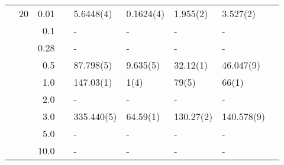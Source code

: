 \begin{table}[H]
\begin{tabularx}{\textwidth}{R{1cm}rrcR{2.3cm}R{2.3cm}R{2.3cm}R{2.3cm}R{1cm}}
		&20 & 0.01 && 5.6448(4) & 0.1624(4) & 1.955(2) & 3.527(2) \\
		&& 0.1 && - & - & - & - \\
		&& 0.28 && - & - & - & - \\
		&& 0.5 && 87.798(5) & 9.635(5) & 32.12(1) & 46.047(9) \\
		&& 1.0 && 147.03(1) & 1(4) & 79(5) & 66(1) \\
		&& 2.0 && - & - & - & -\\
		&& 3.0 && 335.440(5) & 64.59(1) & 130.27(2) & 140.578(9) \\ 
		&& 5.0 && - & - & - & -\\
		&& 10.0 && - & - & - & -\\
		\hline \hline
	\end{tabularx}
\end{table}

